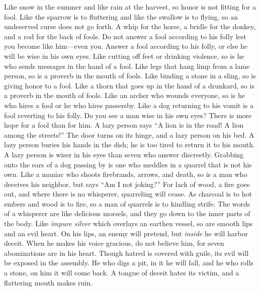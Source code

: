 \begin{biblechapter} %
\verse Like snow in the summer and like rain at the harvest, 
so honor is not fitting for a fool.
\verse Like the sparrow is to fluttering and like the swallow is to flying, 
so an undeserved curse does not go forth.
\verse A whip for the horse, a bridle for the donkey, 
and a rod for the back of fools.
\verse Do not answer a fool according to his folly 
lest you become like him—even you.
\verse Answer a fool according to his folly, 
or else he will be wise in his own eyes.
\verse Like cutting off feet or drinking violence, 
so is he who sends messages in the hand of a fool.
\verse Like legs that hang limp from a lame person, 
so is a proverb in the mouth of fools.
\verse Like binding a stone in a sling, 
so is giving honor to a fool.
\verse Like a thorn that goes up in the hand of a drunkard, 
so is a proverb in the mouth of fools.
\verse Like an archer who wounds everyone, 
so is he who hires a fool or he who hires passersby.
\verse Like a dog returning to his vomit 
is a fool reverting to his folly.
\verse Do you see a man wise in his own eyes? 
There is more hope for a fool than for him.
\verse A lazy person says “A lion is in the road! 
A lion among the streets!”
\verse The door turns on its hinge, 
and a lazy person on his bed.
\verse A lazy person buries his hands in the dish; 
he is too tired to return it to his mouth.
\verse A lazy person is wiser in his eyes 
than seven who answer discreetly.
\verse Grabbing onto the ears of a dog 
passing by is one who meddles in a quarrel that is not his own.
\verse Like a maniac who shoots 
firebrands, arrows, and death,
\verse so is a man who deceives his neighbor, 
but says “Am I not joking?”
\verse For lack of wood, a fire goes out, 
and where there is no whisperer, quarreling will cease.
\verse As charcoal is to hot embers and wood is to fire, 
so a man of quarrels is to kindling strife.
\verse The words of a whisperer are like delicious morsels, 
and they go down to the inner parts of the body.
\verse Like \textit{impure silver} which overlays an earthen vessel, 
so are smooth lips and an evil heart.
\verse On his lips, an enemy will pretend, 
but \textit{inside} he will harbor deceit.
\verse When he makes his voice gracious, do not believe him, 
for seven abominations are in his heart.
\verse Though hatred is covered with guile, 
its evil will be exposed in the assembly.
\verse He who digs a pit, in it he will fall, 
and he who rolls a stone, on him it will come back.
\verse A tongue of deceit hates its victim, 
and a flattering mouth makes ruin.
\end{biblechapter}

